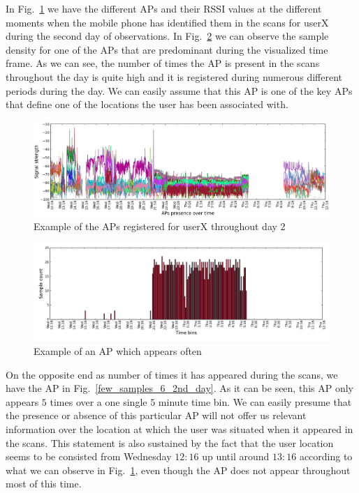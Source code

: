 In Fig.~\ref{rssi_6_2nd_day} we have the different APs and their RSSI values at
the different moments when the mobile phone has identified them in the scans for
userX during the second day of observations. In Fig.~\ref{samples_6_2nd_day} we
can observe the sample density for one of the APs that are predominant during the visualized
time frame. As we can see, the number of times the AP is present in the scans
throughout the day is quite high and it is registered during numerous different
periods during the day. We can easily assume that this AP is one of the key APs
that define one of the locations the user has been associated with.

\begin{figure}[h]
\centering
\includegraphics[width
=\textwidth, height =
0.4\textwidth]{figures/combinations/user_6_sorted_1days_plot_croped.png}
\caption{Example of the APs registered for userX throughout day 2}
\label{rssi_6_2nd_day}
\end{figure}

\begin{figure}[h]
\centering
\includegraphics[width
=\textwidth, height =
0.4\textwidth]{figures/combinations/user_6_sorted_1days_plot_14280_histo.png}
\caption{Example of an AP which appears often}
\label{samples_6_2nd_day}
\end{figure}

On the opposite end as number of times it has appeared during the scans, we have
the AP in Fig.~\ref{few_samples_6_2nd_day}. As it can be seen, this AP only
appears $5$ times over a one single $5$ minute time bin. We can easily presume
that the presence or absence of this particular AP will not offer us relevant
information over the location at which the user was situated when it appeared in
the scans. This statement is also sustained by the fact that the user location
seems to be consisted from Wednesday $12:16$ up until around $13:16$ according
to what we can observe in Fig.~\ref{rssi_6_2nd_day}, even though the AP does not appear
throughout most of this time.

